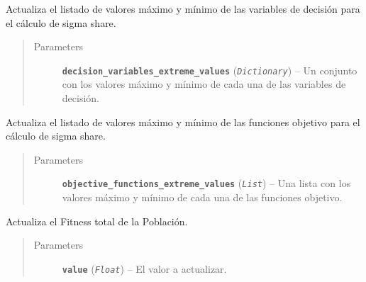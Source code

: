 \documentclass[letterpaper,10pt,english]{sphinxmanual}
\begin{document}
\begin{fulllineitems}
\begin{fulllineitems}
\end{fulllineitems}


\begin{fulllineitems}
\label{Model/Community/Population/Population:Model.Community.Population.Population.Population.set_decision_variables_extreme_values}
Actualiza el listado de valores máximo y mínimo de las
variables de decisión para el cálculo de sigma share.
\begin{quote}\begin{description}
\item[{Parameters}] \leavevmode
\textbf{\texttt{decision\_variables\_extreme\_values}} (\emph{\texttt{Dictionary}}) -- Un conjunto con los valores máximo y mínimo
de cada una de las variables de decisión.

\end{description}\end{quote}

\end{fulllineitems}


\begin{fulllineitems}
\label{Model/Community/Population/Population:Model.Community.Population.Population.Population.set_objective_functions_extreme_values}
Actualiza el listado de valores máximo y mínimo de las
funciones objetivo para el cálculo de sigma share.
\begin{quote}\begin{description}
\item[{Parameters}] \leavevmode
\textbf{\texttt{objective\_functions\_extreme\_values}} (\emph{\texttt{List}}) -- Una lista con los valores máximo y mínimo
de cada una de las funciones objetivo.

\end{description}\end{quote}

\end{fulllineitems}


\begin{fulllineitems}
\label{Model/Community/Population/Population:Model.Community.Population.Population.Population.set_total_fitness}
Actualiza el Fitness total de la Población.
\begin{quote}\begin{description}
\item[{Parameters}] \leavevmode
\textbf{\texttt{value}} (\emph{\texttt{Float}}) -- El valor a actualizar.


\end{description}
\end{quote}
\end{fulllineitems}
\end{fulllineitems}
\end{document}
